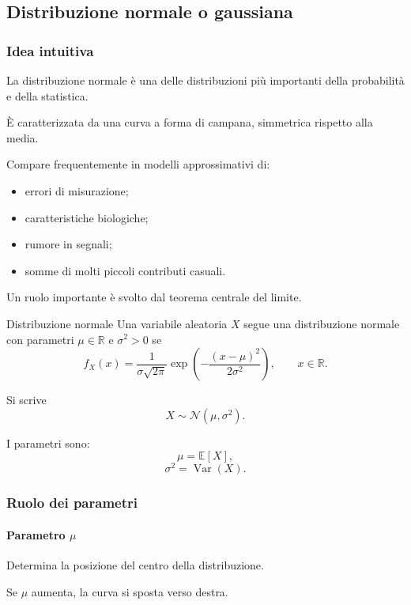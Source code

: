 \subsection{Distribuzione normale o gaussiana}

\subsubsection{Idea intuitiva}

La distribuzione normale
è una delle distribuzioni
più importanti della probabilità
e della statistica.

È caratterizzata da una curva
a forma di campana,
simmetrica rispetto alla media.

Compare frequentemente
in modelli approssimativi di:
\begin{itemize}
    \item errori di misurazione;
    \item caratteristiche biologiche;
    \item rumore in segnali;
    \item somme di molti piccoli
    contributi casuali.
\end{itemize}

Un ruolo importante è svolto
dal teorema centrale del limite.

\begin{definition}{Distribuzione normale}
Una variabile aleatoria $X$
segue una distribuzione normale
con parametri $\mu\in\mathbb{R}$
e $\sigma^2>0$ se
\[
\boxed{
f_X(x)
=
\frac1{\sigma\sqrt{2\pi}}
\exp\left(
-\frac{(x-\mu)^2}{2\sigma^2}
\right),
\qquad x\in\mathbb{R}.
}
\]

Si scrive
\[
X\sim\mathcal{N}(\mu,\sigma^2).
\]
\end{definition}

I parametri sono:
\[
\mu=\mathbb{E}[X],
\]
\[
\sigma^2=\operatorname{Var}(X).
\]

\subsubsection{Ruolo dei parametri}

\paragraph{Parametro $\mu$}

Determina la posizione
del centro della distribuzione.

Se $\mu$ aumenta,
la curva si sposta verso destra.

